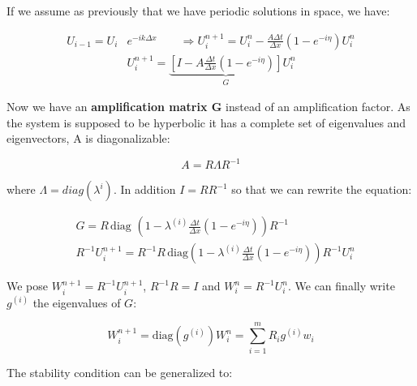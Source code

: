 If we assume as previously that we have periodic solutions in space, we have: 

\begin{equation}
\begin{aligned}
U_{i-1} = U_i &e^{-i k \Delta x} \qquad \Rightarrow U_i^{n+1} = U_i^n - \frac{A \Delta t}{\Delta x} (1 - e^{-i\eta}) U_i^n \\
&U_i^{n+1} = \underbrace{\left[I - A \frac{\Delta t}{\Delta x} (1 - e^{-i\eta})\right]}_{G} U_i^n
\end{aligned}
\end{equation}

Now we have an \textbf{amplification matrix G} instead of an amplification factor. As the system is supposed to be hyperbolic it has a complete set of eigenvalues and eigenvectors, A is diagonalizable: 

\begin{equation}
A = R\Lambda R^{-1}
\end{equation}

where $\Lambda = diag (\lambda ^{i})$. In addition $I = RR^{-1}$ so that we can rewrite the equation: 

\begin{equation}
\begin{aligned}
&G = R \, \mbox{diag }\left(1 - \lambda ^{(i)}\frac{\Delta t}{\Delta x} (1-e^{-i\eta})\right) R^{-1}\\
&R^{-1}U_i^{n+1} = R^{-1}R \,\mbox{diag} \left(1 - \lambda ^{(i)} \frac{\Delta t}{\Delta x} (1-e^{-i \eta}) \right) R^{-1}U_i^n
\end{aligned}
\end{equation}

We pose $W_i^{n+1} = R^{-1}U_i^{n+1}$, $R^{-1}R = I$ and $W_i^{n} = R^{-1}U_i^{n}$. We can finally write $g^{(i)}$ the eigenvalues of $G$: 

\begin{equation}
W_i^{n+1} = \mbox{diag}\left(g^{(i)}\right) W_i ^n = \sum _{i=1}^m R_i g^{(i)}w_i
\end{equation}

The stability condition can be generalized to: 

\ \\

